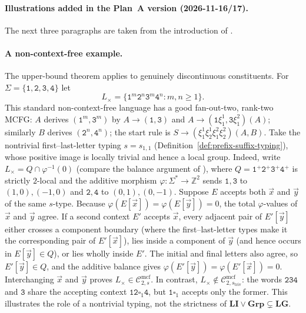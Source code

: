 \documentclass[11pt]{article}
\numberwithin{equation}{section}
\theoremstyle{plain}
\theoremstyle{definition}
\theoremstyle{remark}
\newcommand{\Cmcf}[2]{\mathcal{C}^{\mathrm{mcf}}_{#1,#2}}
\newcommand{\tuple}[1]{\vec{#1}}
\newcommand{\blank}{\square}
\theoremstyle{plain}
\begin{document}
\paragraph{Illustrations added in the Plan~A version (2026-11-16/17).}
The next three paragraphs are taken from the introduction of .

\paragraph{A non-context-free example.}
The upper-bound theorem applies to genuinely discontinuous
constituents.  For $\Sigma=\{\mathtt1,\mathtt2,\mathtt3,\mathtt4\}$ let
\[
 L_\times=\{\mathtt1^m\mathtt2^n\mathtt3^m\mathtt4^n:m,n\ge1\}.
\]
This standard non-context-free language has a good fan-out-two,
rank-two MCFG: $A$ derives $(\mathtt1^m,\mathtt3^m)$ by
$A\to(\mathtt1,\mathtt3)$ and
$A\to(\mathtt1\xi_1^1,\mathtt3\xi_1^2)(A)$;
similarly $B$ derives $(\mathtt2^n,\mathtt4^n)$; the start
rule is $S\to(\xi_1^1\xi_2^1\xi_1^2\xi_2^2)(A,B)$.
Take the nontrivial first--last-letter typing
$s=s_{1,1}$ (Definition~\ref{def:prefix-suffix-typing}),
whose positive image is locally trivial and hence a local group.
Indeed, write $L_\times=Q\cap\varphi^{-1}(0)$ (compare the
balance argument of \cite[Proposition~3.1]{KuriyamaMCFGpreprint}), where
$Q=\mathtt1^+\mathtt2^+\mathtt3^+\mathtt4^+$ is strictly $2$-local
and the additive morphism $\varphi:\Sigma^*\to\mathbb Z^2$
sends $\mathtt1,\mathtt3$ to $(1,0),(-1,0)$ and
$\mathtt2,\mathtt4$ to $(0,1),(0,-1)$.
Suppose $E$ accepts both $\tuple x$ and $\tuple y$ of the same
$s$-type.  Because $\varphi(E[\tuple x])=\varphi(E[\tuple y])=0$,
the total $\varphi$-values of $\tuple x$ and $\tuple y$ agree.
If a second context $E'$ accepts $\tuple x$, every adjacent pair
of $E'[\tuple y]$ either crosses a component boundary (where the
first--last-letter types make it the corresponding pair of
$E'[\tuple x]$), lies inside a component of $\tuple y$ (and hence
occurs in $E[\tuple y]\in Q$), or lies wholly inside $E'$.
The initial and final letters also agree, so
$E'[\tuple y]\in Q$, and the additive balance gives
$\varphi(E'[\tuple y])=\varphi(E'[\tuple x])=0$.
Interchanging $\tuple x$ and $\tuple y$ proves
$L_\times\in\Cmcf{2}{s}$.
In contrast, $L_\times\notin\Cmcf{2}{s_{\mathrm{triv}}}$:
the words $\mathtt{234}$ and $\mathtt3$ share the accepting context
$\mathtt{12}\blank_1\mathtt4$, but
$\mathtt1\blank_1$ accepts only the former.
This illustrates the role of a nontrivial typing, not the
strictness of $\mathbf{LI}\vee\mathbf{Grp}\subsetneq\mathbf{LG}$.
\end{document}

